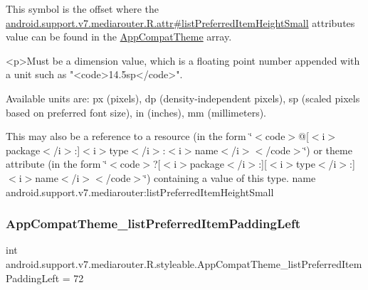 This symbol is the offset where the \hyperlink{classandroid_1_1support_1_1v7_1_1mediarouter_1_1R_1_1attr_af8335a46023911148d7e44055b5afc03}{android.\+support.\+v7.\+mediarouter.\+R.\+attr\#list\+Preferred\+Item\+Height\+Small} attribute\textquotesingle{}s value can be found in the \hyperlink{classandroid_1_1support_1_1v7_1_1mediarouter_1_1R_1_1styleable_a4e3d3900c75d49aeb2f283cac00214d6}{App\+Compat\+Theme} array.

\begin{DoxyVerb}      <p>Must be a dimension value, which is a floating point number appended with a unit such as "<code>14.5sp</code>".
\end{DoxyVerb}
 Available units are\+: px (pixels), dp (density-\/independent pixels), sp (scaled pixels based on preferred font size), in (inches), mm (millimeters). 

This may also be a reference to a resource (in the form \char`\"{}$<$code$>$@\mbox{[}$<$i$>$package$<$/i$>$\+:\mbox{]}$<$i$>$type$<$/i$>$\+:$<$i$>$name$<$/i$>$$<$/code$>$\char`\"{}) or theme attribute (in the form \char`\"{}$<$code$>$?\mbox{[}$<$i$>$package$<$/i$>$\+:\mbox{]}\mbox{[}$<$i$>$type$<$/i$>$\+:\mbox{]}$<$i$>$name$<$/i$>$$<$/code$>$\char`\"{}) containing a value of this type.  name android.\+support.\+v7.\+mediarouter\+:list\+Preferred\+Item\+Height\+Small \mbox{\label{classandroid_1_1support_1_1v7_1_1mediarouter_1_1R_1_1styleable_adcdce820a384c778b4746b452ffec297}} 
\subsubsection{\texorpdfstring{App\+Compat\+Theme\+\_\+list\+Preferred\+Item\+Padding\+Left}{AppCompatTheme\_listPreferredItemPaddingLeft}}
{\footnotesize\ttfamily int android.\+support.\+v7.\+mediarouter.\+R.\+styleable.\+App\+Compat\+Theme\+\_\+list\+Preferred\+Item\+Padding\+Left = 72\hspace{0.3cm}{\ttfamily [static]}}

